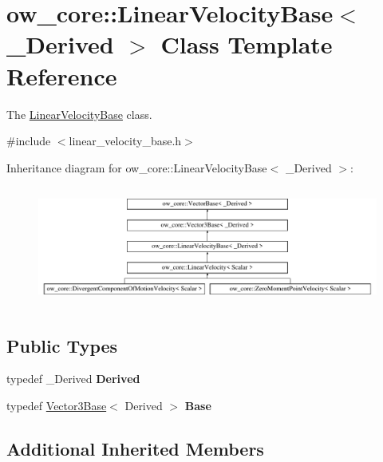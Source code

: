 \hypertarget{classow__core_1_1LinearVelocityBase}{}\section{ow\+\_\+core\+:\+:Linear\+Velocity\+Base$<$ \+\_\+\+Derived $>$ Class Template Reference}
\label{classow__core_1_1LinearVelocityBase}


The \hyperlink{classow__core_1_1LinearVelocityBase}{Linear\+Velocity\+Base} class.  




{\ttfamily \#include $<$linear\+\_\+velocity\+\_\+base.\+h$>$}

Inheritance diagram for ow\+\_\+core\+:\+:Linear\+Velocity\+Base$<$ \+\_\+\+Derived $>$\+:\begin{figure}[H]
\begin{center}
\leavevmode
\includegraphics[height=3.977273cm]{d6/db3/classow__core_1_1LinearVelocityBase}
\end{center}
\end{figure}
\subsection*{Public Types}
\begin{DoxyCompactItemize}
\item 
typedef \+\_\+\+Derived {\bfseries Derived}\hypertarget{classow__core_1_1LinearVelocityBase_a7257319478a51ce8143ac104a26d9deb}{}\label{classow__core_1_1LinearVelocityBase_a7257319478a51ce8143ac104a26d9deb}

\item 
typedef \hyperlink{classow__core_1_1Vector3Base}{Vector3\+Base}$<$ Derived $>$ {\bfseries Base}\hypertarget{classow__core_1_1LinearVelocityBase_ab0b1da4efb788b8360979f0035b1db8e}{}\label{classow__core_1_1LinearVelocityBase_ab0b1da4efb788b8360979f0035b1db8e}

\end{DoxyCompactItemize}
\subsection*{Additional Inherited Members}


